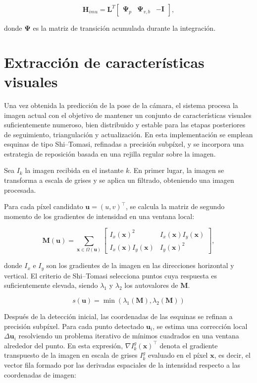 \begin{equation}
    \mathbf{H}_{imu}
    =
    \mathbf{L}^{T}
    \begin{bmatrix}
        \boldsymbol{\Psi}_{p} &
        \boldsymbol{\Psi}_{v,b} &
        -\mathbf{I}
    \end{bmatrix},
\end{equation}

donde $\boldsymbol{\Psi}$ es la matriz de transición acumulada durante la integración.


\section{Extracción de características visuales}

Una vez obtenida la predicción de la pose de la cámara, el sistema procesa la imagen
actual con el objetivo de mantener un conjunto de características visuales suficientemente
numeroso, bien distribuido y estable para las etapas posteriores de seguimiento, triangulación
y actualización. En esta implementación se emplean esquinas de tipo Shi--Tomasi,
refinadas a precisión subpíxel, y se incorpora una estrategia de reposición basada en una
rejilla regular sobre la imagen.

Sea $I_k$ la imagen recibida en el instante $k$. En primer lugar, la imagen se transforma
a escala de grises y se aplica un filtrado, obteniendo una imagen procesada.

Para cada píxel candidato $\mathbf{u} = (u,v)^\top$, se calcula la matriz de segundo
momento de los gradientes de intensidad en una ventana local:

\[
\mathbf{M}(\mathbf{u}) =
\sum_{\mathbf{x} \in \Omega(\mathbf{u})}
\begin{bmatrix}
I_x(\mathbf{x})^2 & I_x(\mathbf{x}) I_y(\mathbf{x}) \\
I_x(\mathbf{x}) I_y(\mathbf{x}) & I_y(\mathbf{x})^2
\end{bmatrix},
\]

donde $I_x$ e $I_y$ son los gradientes de la imagen en las direcciones horizontal y
vertical. El criterio de Shi--Tomasi selecciona puntos cuya respuesta es suficientemente elevada, siendo $\lambda_1$ y $\lambda_2$ los autovalores de
$\mathbf{M}$.

\[
s(\mathbf{u}) = \min(\lambda_1(\mathbf{M}), \lambda_2(\mathbf{M}))
\]



Después de la detección inicial, las coordenadas de las esquinas se refinan a precisión
subpíxel. Para cada punto detectado $\mathbf{u}_i$, se estima una corrección local
$\Delta \mathbf{u}_i$ resolviendo un problema iterativo de mínimos cuadrados en una
ventana alrededor del punto. En esta expresión, $\nabla I_k^g(\mathbf{x})^\top$ denota el
gradiente transpuesto de la imagen en escala de grises $I_k^g$ evaluado en el píxel
$\mathbf{x}$, es decir, el vector fila formado por las derivadas espaciales de la
intensidad respecto a las coordenadas de imagen:

